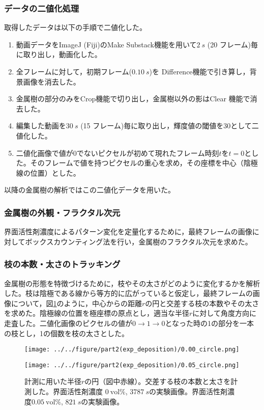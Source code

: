 \documentclass[autodetect-engine,dvi=dvipdfmx,a4paper,ja=standard,oneside,openany,11pt]{bxjsbook}
\begin{document}
\subsubsection{データの二値化処理}
取得したデータは以下の手順で二値化した。
\begin{enumerate}
  \item 動画データをImageJ (Fiji)のMake Substack機能を用いて$\SI{2}{s}$ (20 フレーム)毎に取り出し，動画化した。
  \item 全フレームに対して，初期フレーム($\SI{0.10}{s}$)を Difference機能で引き算し，背景画像を消去した。
  \item 金属樹の部分のみをCrop機能で切り出し，金属樹以外の影はClear 機能で消去した。
  \item 編集した動画を$\SI{30}{s}$ (15 フレーム)毎に取り出し，輝度値の閾値を30として二値化した。
  \item 二値化画像で値が0でないピクセルが初めて現れたフレーム時刻$t$を$t=0$とした。そのフレームで値を持つピクセルの重心を求め，その座標を中心（陰極線の位置）とした。
\end{enumerate}
以降の金属樹の解析ではこの二値化データを用いた。
\subsubsection{金属樹の外観・フラクタル次元}
界面活性剤濃度によるパターン変化を定量化するために，最終フレームの画像に対してボックスカウンティング法を行い，金属樹のフラクタル次元を求めた。
\subsubsection{枝の本数・太さのトラッキング}
金属樹の形態を特徴づけるために，枝やその太さがどのように変化するかを解析した。枝は陰極である線から等方的に広がっていると仮定し，最終フレームの画像について，図\ref{fig:circle}のように，中心からの距離$r$の円と交差する枝の本数やその太さを求めた。陰極線の位置を極座標の原点とし，適当な半径$r$に対して角度方向に走査した。二値化画像のピクセルの値が$0\rightarrow1\rightarrow0$となった時の1の部分を一本の枝とし，1の個数を枝の太さとした。

\begin{figure}[htbp]
  \begin{minipage}
    {0.5\textwidth}
    \subcaption{}
    \centering
    \texttt{[image: ../../figure/part2(exp\_deposition)/0.00\_circle.png]}
    \label{fig:0.00_circle}
  \end{minipage}
  \begin{minipage}
    {0.5\textwidth}
    \subcaption{}
    \centering
    \texttt{[image: ../../figure/part2(exp\_deposition)/0.05\_circle.png]}
    \label{fig:0.05_circle}
  \end{minipage}
  \caption{計測に用いた半径$r$の円（図中赤線）。交差する枝の本数と太さを計測した。界面活性剤濃度 $\SI{0}{\mathrm{vol}\%}$, $\SI{3787}{s}$の実験画像。界面活性剤濃度$\SI{0.05}{\mathrm{vol}\%}$, $\SI{821}{s}$の実験画像。}
  \label{fig:circle}
\end{figure}
\end{document}
